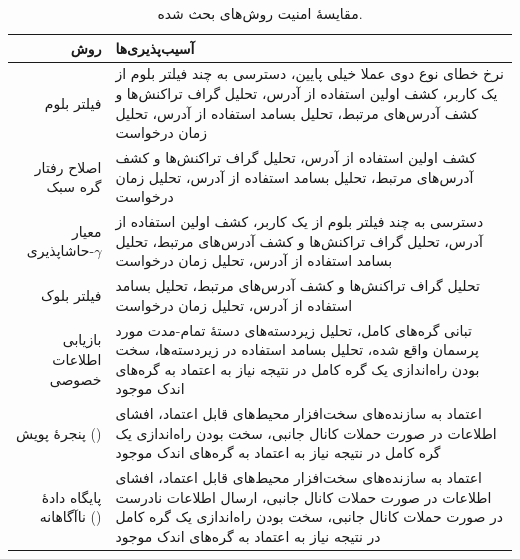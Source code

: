 \begin{xltabular}{\textwidth}{|r|X|}
	\caption{
		مقایسهٔ امنیت روش‌های بحث شده.
		\label{table:SecurityCmp}}\\
	\hline
	\textbf{روش} & \textbf{آسیب‌پذیری‌ها} \\
	\hline 
	{%
		فیلتر بلوم \cite{Hearn2013}
	} & {%
		نرخ خطای نوع دوی عملا خیلی پایین، دسترسی به چند فیلتر بلوم از یک کاربر، کشف اولین استفاده از آدرس، تحلیل گراف تراکنش‌ها و کشف آدرس‌های مرتبط، تحلیل بسامد استفاده از آدرس، تحلیل زمان درخواست
	} \\
\hline
	{%
		اصلاح رفتار گره سبک \cite{Gervais2014}
	} & {%
		کشف اولین استفاده از آدرس، تحلیل گراف تراکنش‌ها و کشف آدرس‌های مرتبط، تحلیل بسامد استفاده از آدرس، تحلیل زمان درخواست
	}\\
\hline
	{%
		معیار حاشاپذیری-$\gamma$ \cite{Kanemura2017}
	} & {%
		دسترسی به چند فیلتر بلوم از یک کاربر، کشف اولین استفاده از آدرس، تحلیل گراف تراکنش‌ها و کشف آدرس‌های مرتبط، تحلیل بسامد استفاده از آدرس، تحلیل زمان درخواست
	}\\
\hline
	{%
		فیلتر بلوک \cite{Osuntokun2017}
	} & {%
		تحلیل گراف تراکنش‌ها و کشف آدرس‌های مرتبط، تحلیل بسامد استفاده از آدرس، تحلیل زمان درخواست
	}\\
\hline
	{%
		بازیابی اطلاعات خصوصی \cite{Qin2019}
	} & {%
		تبانی گره‌های کامل، تحلیل زیردسته‌های دستهٔ تمام-مدت مورد پرسمان واقع شده، تحلیل بسامد استفاده در زیردسته‌ها، سخت بودن راه‌اندازی یک گره کامل در نتیجه نیاز به اعتماد به گره‌های اندک موجود
	}\\
\hline
	{%
		پنجرهٔ پویش () \cite{Matetic2019}
	} & {%
		اعتماد به سازنده‌های سخت‌افزار محیط‌های قابل اعتماد، افشای اطلاعات در صورت حملات کانال جانبی، سخت بودن راه‌اندازی یک گره کامل در نتیجه نیاز به اعتماد به گره‌های اندک موجود
	}\\
\hline
	{%
		پایگاه دادهٔ ناآگاهانه () \cite{Matetic2019}
	} & {%
		اعتماد به سازنده‌های سخت‌افزار محیط‌های قابل اعتماد، افشای اطلاعات در صورت حملات کانال جانبی، ارسال اطلاعات نادرست در صورت حملات کانال جانبی، سخت بودن راه‌اندازی یک گره کامل در نتیجه نیاز به اعتماد به گره‌های اندک موجود
	}\\
\hline	
\end{xltabular}

